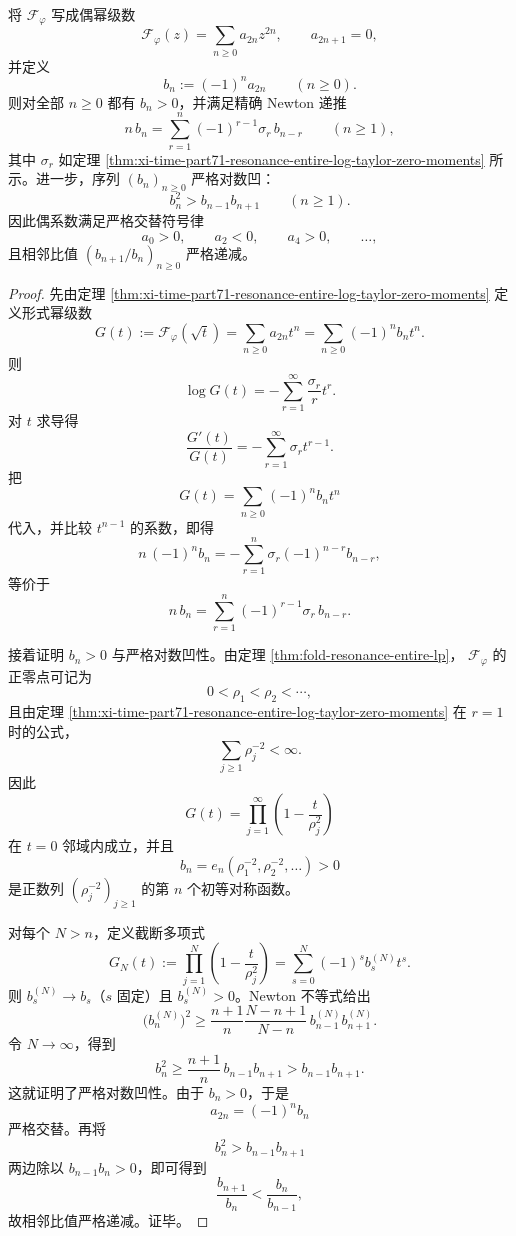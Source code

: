\begin{theorem}\label{thm:xi-time-part71-resonance-entire-even-coefficient-newton-logconcavity}
将 \(\mathcal F_\varphi\) 写成偶幂级数
\[
\mathcal F_\varphi(z)=\sum_{n\ge 0}a_{2n}z^{2n},
\qquad
a_{2n+1}=0,
\]
并定义
\[
b_n:=(-1)^n a_{2n}
\qquad (n\ge 0).
\]
则对全部 \(n\ge 0\) 都有 \(b_n>0\)，并满足精确 Newton 递推
\[
n\,b_n
=
\sum_{r=1}^{n}(-1)^{r-1}\sigma_r\,b_{n-r}
\qquad (n\ge 1),
\]
其中 \(\sigma_r\) 如定理 \ref{thm:xi-time-part71-resonance-entire-log-taylor-zero-moments} 所示。进一步，序列 \((b_n)_{n\ge 0}\) 严格对数凹：
\[
b_n^2>b_{n-1}b_{n+1}
\qquad (n\ge 1).
\]
因此偶系数满足严格交替符号律
\[
a_0>0,\qquad a_2<0,\qquad a_4>0,\qquad \dots,
\]
且相邻比值 \((b_{n+1}/b_n)_{n\ge 0}\) 严格递减。
\end{theorem}
\begin{proof}
先由定理 \ref{thm:xi-time-part71-resonance-entire-log-taylor-zero-moments} 定义形式幂级数
\[
G(t):=\mathcal F_\varphi(\sqrt t)
=
\sum_{n\ge 0}a_{2n}t^n
=
\sum_{n\ge 0}(-1)^n b_n t^n.
\]
则
\[
\log G(t)
=
-\sum_{r=1}^{\infty}\frac{\sigma_r}{r}t^r.
\]
对 \(t\) 求导得
\[
\frac{G'(t)}{G(t)}
=
-\sum_{r=1}^{\infty}\sigma_r t^{r-1}.
\]
把
\[
G(t)=\sum_{n\ge 0}(-1)^n b_n t^n
\]
代入，并比较 \(t^{n-1}\) 的系数，即得
\[
n\,(-1)^n b_n
=
-\sum_{r=1}^{n}\sigma_r(-1)^{n-r}b_{n-r},
\]
等价于
\[
n\,b_n
=
\sum_{r=1}^{n}(-1)^{r-1}\sigma_r\,b_{n-r}.
\]

接着证明 \(b_n>0\) 与严格对数凹性。由定理 \ref{thm:fold-resonance-entire-lp}，
\(\mathcal F_\varphi\) 的正零点可记为
\[
0<\rho_1<\rho_2<\cdots,
\]
且由定理 \ref{thm:xi-time-part71-resonance-entire-log-taylor-zero-moments} 在 \(r=1\) 时的公式，
\[
\sum_{j\ge 1}\rho_j^{-2}<\infty.
\]
因此
\[
G(t)=\prod_{j=1}^{\infty}\left(1-\frac{t}{\rho_j^2}\right)
\]
在 \(t=0\) 邻域内成立，并且
\[
b_n=e_n(\rho_1^{-2},\rho_2^{-2},\dots)>0
\]
是正数列 \((\rho_j^{-2})_{j\ge 1}\) 的第 \(n\) 个初等对称函数。

对每个 \(N>n\)，定义截断多项式
\[
G_N(t):=\prod_{j=1}^{N}\left(1-\frac{t}{\rho_j^2}\right)
=
\sum_{s=0}^{N}(-1)^s b_s^{(N)}t^s.
\]
则 \(b_s^{(N)}\to b_s\)（\(s\) 固定）且 \(b_s^{(N)}>0\)。Newton 不等式给出
\[
\bigl(b_n^{(N)}\bigr)^2
\ge
\frac{n+1}{n}\frac{N-n+1}{N-n}\,
b_{n-1}^{(N)}b_{n+1}^{(N)}.
\]
令 \(N\to\infty\)，得到
\[
b_n^2
\ge
\frac{n+1}{n}\,b_{n-1}b_{n+1}
>
b_{n-1}b_{n+1}.
\]
这就证明了严格对数凹性。由于 \(b_n>0\)，于是
\[
a_{2n}=(-1)^n b_n
\]
严格交替。再将
\[
b_n^2>b_{n-1}b_{n+1}
\]
两边除以 \(b_{n-1}b_n>0\)，即可得到
\[
\frac{b_{n+1}}{b_n}<\frac{b_n}{b_{n-1}},
\]
故相邻比值严格递减。证毕。
\end{proof}

